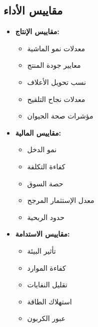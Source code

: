 \subsection{مقاييس الأداء}
\begin{itemize}
    \item \textbf{مقاييس الإنتاج:}
    \begin{itemize}
        \item معدلات نمو الماشية
        \item معايير جودة المنتج
        \item نسب تحويل الأعلاف
        \item معدلات نجاح التلقيح
        \item مؤشرات صحة الحيوان
    \end{itemize}
    
    \item \textbf{مقاييس المالية:}
    \begin{itemize}
        \item نمو الدخل
        \item كفاءة التكلفة
        \item حصة السوق
        \item معدل الإستثمار المرجح
        \item حدود الربحية
    \end{itemize}
    
    \item \textbf{مقاييس الاستدامة:}
    \begin{itemize}
        \item تأثير البيئة
        \item كفاءة الموارد
        \item تقليل النفايات
        \item استهلاك الطاقة
        \item عبور الكربون
    \end{itemize}
\end{itemize}

